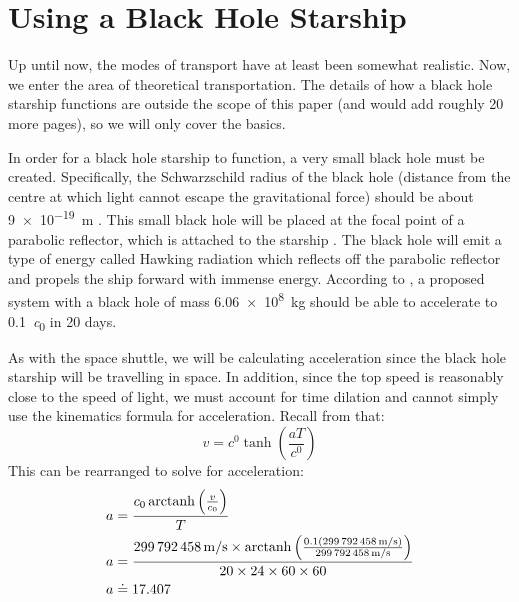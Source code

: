 \section{Using a Black Hole Starship}
	Up until now, the modes of transport have at least been somewhat realistic.
	Now, we enter the area of theoretical transportation. The details of how a black hole starship functions are outside the scope of this paper (and would add roughly 20 more pages), so we will only cover the basics.
	
	In order for a black hole starship to function, a very small black hole must be created.
	Specifically, the Schwarzschild radius of the black hole (distance from the centre at which light cannot escape the gravitational force) should be about \SI{9e-19}{\metre} \autocite{blackHoleStarship}.
	This small black hole will be placed at the focal point of a parabolic reflector, which is attached to the starship \autocite{blackHoleStarship}.
	The black hole will emit a type of energy called Hawking radiation which reflects off the parabolic reflector and propels the ship forward with immense energy.
	According to \cite{blackHoleStarship}, a proposed system with a black hole of mass \SI{6.06e8}{\kg} should be able to accelerate to \SI{0.1}{\clight} in 20 days. 
	
	As with the space shuttle, we will be calculating acceleration since the black hole starship will be travelling in space.
	In addition, since the top speed is reasonably close to the speed of light, we must account for time dilation and cannot simply use the kinematics formula for acceleration.
	Recall from \cite{sracceleration} that:
	\[v = \si{\clight} \tanh \left(\frac{aT}{\si{\clight}}\right)\]
	This can be rearranged to solve for acceleration:
	\begin{align*}
		a &= \frac{\si{\clight} \arctanh \left(\frac{v}{\si{\clight}}\right)}{T}\\
		a &= \frac{\SI{299792458}{\metre/\second} \times \arctanh \left(\frac{0.1(\SI{299792458}{\metre/\second})}{\SI{299792458}{\metre/\second}}\right)}{20 \times 24 \times 60 \times 60}\\
		a &\doteq 17.407
	\end{align*}
